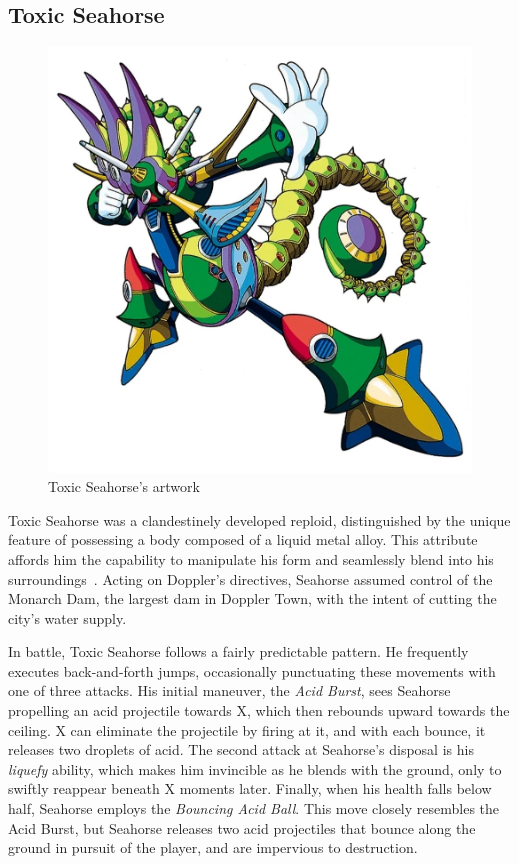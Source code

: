 \subsection{Toxic Seahorse}\label{boss:Toxic_seahorse}
\begin{figure}[htp]
	\centering
	\includegraphics[height=\portraitsize]{figures/X3/Toxic_seahorse/toxicseahorse.png}
	\caption{Toxic Seahorse's artwork~\cite{book:MMX_Complete_art}}
\end{figure}

Toxic Seahorse was a clandestinely developed reploid, distinguished by the unique feature of possessing a body composed of a liquid metal alloy. This attribute affords him the capability to manipulate his form and seamlessly blend into his surroundings~\cite{wiki:Toxic_seahorse,wayback:X3_resources}. Acting on Doppler's directives, Seahorse assumed control of the Monarch Dam, the largest dam in Doppler Town, with the intent of cutting the city's water supply.

In battle, Toxic Seahorse follows a fairly predictable pattern. He frequently executes back-and-forth jumps, occasionally punctuating these movements with one of three attacks. His initial maneuver, the \emph{Acid Burst}, sees Seahorse propelling an acid projectile towards X, which then rebounds upward towards the ceiling. X can eliminate the projectile by firing at it, and with each bounce, it releases two droplets of acid. The second attack at Seahorse's disposal is his \emph{liquefy} ability, which makes him invincible as he blends with the ground, only to swiftly reappear beneath X moments later. Finally, when his health falls below half, Seahorse employs the \emph{Bouncing Acid Ball}. This move closely resembles the Acid Burst, but Seahorse releases two acid projectiles that bounce along the ground in pursuit of the player, and are impervious to destruction.

